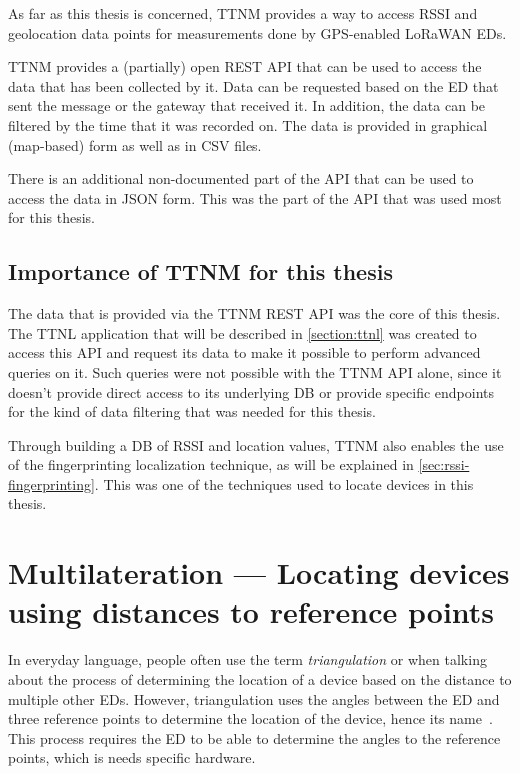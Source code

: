 As far as this thesis is concerned, \acl{TTNM} provides a way to access \ac{RSSI} and geolocation data points for measurements done by \ac{GPS}-enabled \ac{LoRaWAN} \aclp{ED}.

\ac{TTNM} provides a (partially) open \ac{REST} \ac{API} that can be used to access the data that has been collected by it.
Data can be requested based on the \acl{ED} that sent the message or the gateway that received it.
In addition, the data can be filtered by the time that it was recorded on.
The data is provided in graphical (map-based) form as well as in \ac{CSV} files.

There is an additional non-documented part of the \ac{API} that can be used to access the data in \ac{JSON} form.
This was the part of the \ac{API} that was used most for this thesis.

\subsection{Importance of \acl{TTNM} for this thesis}\label{sec:ttn-mapper-importance}

The data that is provided via the \ac{TTNM} \ac{REST} \ac{API} was the core of this thesis.
The \ac{TTNL} application that will be described in \cref{section:ttnl} was created to access this \ac{API} and request its data to make it possible to perform advanced queries on it.
Such queries were not possible with the \ac{TTNM} \ac{API} alone, since it doesn't provide direct access to its underlying \ac{DB} or provide specific endpoints for the kind of data filtering that was needed for this thesis.

Through building a \ac{DB} of \ac{RSSI} and location values, \ac{TTNM} also enables the use of the fingerprinting localization technique, as will be explained in \cref{sec:rssi-fingerprinting}.
This was one of the techniques used to locate devices in this thesis.

\section{Multilateration — Locating devices using distances to reference points}\label{sec:multilateration-basics}

In everyday language, people often use the term \emph{triangulation} or when talking about the process of determining the location of a device based on the distance to multiple other \aclp{ED}.
However, triangulation uses the angles between the \acl{ED} and three reference points to determine the location of the device, hence its name~\cite{yaro_multiangulation_2017}.
This process requires the \acl{ED} to be able to determine the angles to the reference points, which is needs specific hardware.

